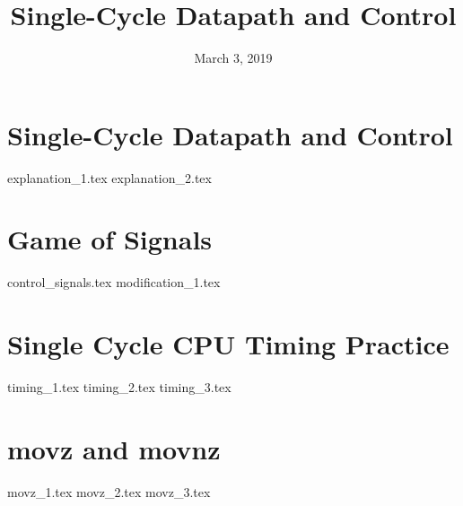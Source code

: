 \documentclass[11pt]{exam}
\title{Single-Cycle Datapath and Control}
\date{March 3, 2019}
\begin{document}
\maketitle

\section{Single-Cycle Datapath and Control}
\begin{questions}
{explanation_1.tex}
{explanation_2.tex}
\end{questions}
\newpage

\section{Game of Signals}
\begin{questions}
{control_signals.tex}
{modification_1.tex}
\end{questions}
\newpage

\section{Single Cycle CPU Timing Practice}
\begin{questions}
{timing_1.tex}
{timing_2.tex}
{timing_3.tex}
\end{questions}
\newpage

\section{movz and movnz}
\begin{questions}
{movz_1.tex}
{movz_2.tex}
{movz_3.tex}
\end{questions}
\newpage
\end{document}
